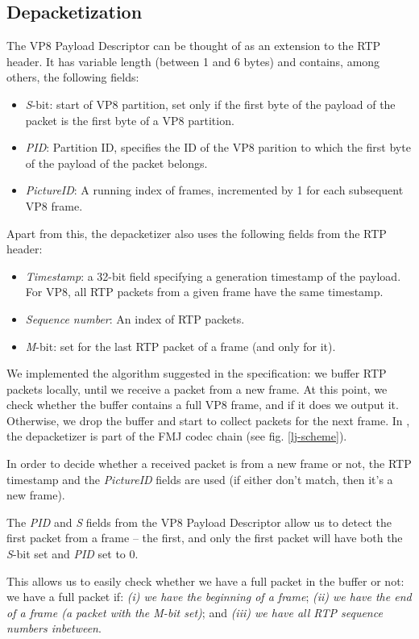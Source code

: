 \documentclass[twoside,openright,a4paper,12pt,english]{article}
\begin{document}
\subsection{Depacketization}
\label{depacketizer}
The VP8 Payload Descriptor can be thought of as an extension to the RTP header. It has variable length (between 1 and 6 bytes) and contains, among others, the following fields:
\begin{itemize}
\item \emph{S}-bit: start of VP8 partition, set only if the first byte of the payload of the packet is the first byte of a VP8 partition.
\item \emph{PID}: Partition ID, specifies the ID of the VP8 parition to which the first byte of the payload of the packet belongs.
\item \emph{PictureID}: A running index of frames, incremented by 1 for each subsequent VP8 frame.
\end{itemize}

Apart from this, the depacketizer also uses the following fields from the RTP header:
\begin{itemize}
\item \emph{Timestamp}: a 32-bit field specifying a generation timestamp of the payload. For VP8, all RTP packets from a given frame have the same timestamp.
\item \emph{Sequence number}: An index of RTP packets.
\item \emph{M}-bit: set for the last RTP packet of a frame (and only for it).
\end{itemize}

We implemented the algorithm suggested in the specification: we buffer RTP
packets locally, until we receive a packet from a new frame. At this point, we
check whether the buffer contains a full VP8 frame, and if it does we output
it. Otherwise, we drop the buffer and start to collect packets for the next
frame. In \lj, the depacketizer is part of the FMJ codec chain (see fig. \ref{lj-scheme}).

In order to decide whether a received packet is from a new frame or not, the
RTP timestamp and the \emph{PictureID} fields are used (if either don't match,
then it's a new frame). 

The \emph{PID} and \emph{S} fields from the VP8 Payload Descriptor allow us to
detect the first packet from a frame -- the first, and only the first packet
will have both the \emph{S}-bit set and \emph{PID} set to 0.

This allows us to easily check whether we have a full packet
in the buffer or not: we have a full packet if: \emph{(i) we have the beginning
of a frame}; \emph{(ii) we have the end of a frame (a packet with the M-bit
set)}; and \emph{(iii) we have
all RTP sequence numbers inbetween}.
\end{document}
